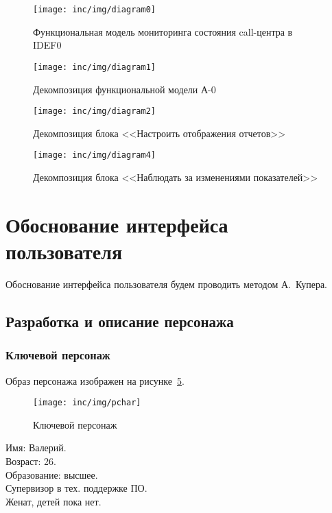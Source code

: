 \begin{figure}[ht]
    \centering
    \texttt{[image: inc/img/diagram0]}
    \caption{Функциональная модель мониторинга состояния call-центра в IDEF0}
    \label{pic:idef0:a0}
\end{figure}

\begin{figure}[ht]
    \centering
    \texttt{[image: inc/img/diagram1]}
    \caption{Декомпозиция функциональной модели А-0}
    \label{pic:idef0:a0:decompose}
\end{figure}

\begin{figure}[ht]
    \centering
    \texttt{[image: inc/img/diagram2]}
    \caption{Декомпозиция блока <<Настроить отображения отчетов>>}
    \label{pic:idef0:a1:decompose}
\end{figure}

\begin{figure}[ht]
    \centering
    \texttt{[image: inc/img/diagram4]}
    \caption{Декомпозиция блока <<Наблюдать за изменениями показателей>>}
    \label{pic:idef0:a2:decompose}
\end{figure}

\section{Обоснование интерфейса пользователя}

Обоснование интерфейса пользователя будем проводить методом А.~Купера. %

\subsection{Разработка и описание персонажа}

\subsubsection{Ключевой персонаж}

Образ персонажа изображен на рисунке~\ref{pic:pcharacter}.

\begin{figure}
    \centering
    \texttt{[image: inc/img/pchar]}
    \caption{Ключевой персонаж}
    \label{pic:pcharacter}
\end{figure}

\noindent Имя: Валерий. \\
Возраст: 26. \\
Образование: высшее. \\
Супервизор в тех. поддержке ПО. \\
Женат, детей пока нет.

